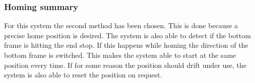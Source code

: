 \documentclass[../../../main]{subfiles}
\begin{document}
\subsubsection{Homing summary}%
\label{ssub:homing_summary}
For this system the second method has been chosen. This is done because a precise home position is desired.
The system is also able to detect if the bottom frame is hitting the end stop. If this happens while homing the direction of the bottom frame is switched.
This makes the system able to start at the same position every time.
If for some reason the position should drift under use, the system is also able to reset the position on request.
\end{document}
